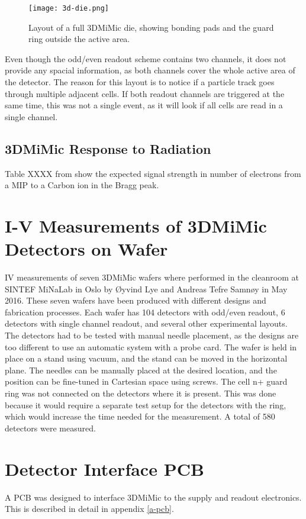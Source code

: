 \documentclass[../main/thesis.tex]{subfiles}
\begin{document}
\begin{figure}%
	\centering
	\texttt{[image: 3d-die.png]}
	\caption{Layout of a full 3DMiMic die, showing bonding pads and the guard ring outside the active area. \citep{Marco}}
	\label{fig-3dmimic-die} %
\end{figure}

Even though the odd/even readout scheme contains two channels, it does not provide any spacial information, as both channels cover the whole active area of the detector. The reason for this layout is to notice if a particle track goes through multiple adjacent cells. If both readout channels are triggered at the same time, this was not a single event, as it will look if all cells are read in a single channel.

\subsection{3DMiMic Response to Radiation}
Table XXXX from \citep{Samnoy} show the expected signal strength in number of electrons from a \gls{MIP} to a Carbon ion in the Bragg peak. 

\section{I-V Measurements of 3DMiMic Detectors on Wafer}
\label{3d-IV}
\gls{IV} measurements of seven 3DMiMic wafers where performed in the cleanroom at SINTEF MiNaLab in Oslo by Øyvind Lye and Andreas Tefre Samnøy in May 2016. These seven wafers have been produced with different designs and fabrication processes. Each wafer has 104 detectors with odd/even readout, 6 detectors with single channel readout, and several other experimental layouts. The detectors had to be tested with manual needle placement, as the designs are too different to use an automatic system with a probe card. The wafer is held in place on a stand using vacuum, and the stand can be moved in the horizontal plane. The needles can be manually placed at the desired location, and the position can be fine-tuned in Cartesian space using screws. The cell n+ guard ring was not connected on the detectors where it is present. This was done because it would require a separate test setup for the detectors with the ring, which would increase the time needed for the measurement. A total of 580 detectors were measured. 

\section{Detector Interface PCB}
\label{3d-pcb}
A \gls{PCB} was designed to interface 3DMiMic to the supply and readout electronics. This is described in detail in appendix \ref{a-pcb}.
\end{document}
